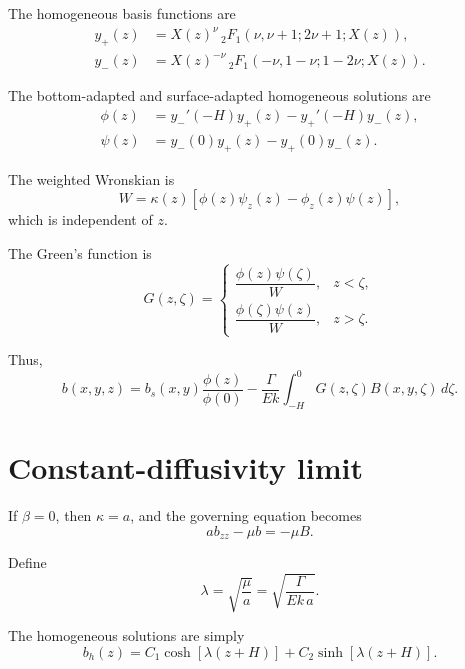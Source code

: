 \documentclass[10pt]{amsart}
\begin{document}
The homogeneous basis functions are
\begin{align}
y_+(z)
&=
X(z)^{\nu}\,
{}_2F_1\!\left(\nu,\nu+1;2\nu+1;X(z)\right),
\\[0.5em]
y_-(z)
&=
X(z)^{-\nu}\,
{}_2F_1\!\left(-\nu,1-\nu;1-2\nu;X(z)\right).
\end{align}

The bottom-adapted and surface-adapted homogeneous solutions are
\begin{align}
\phi(z)
&=
y_-'(-H)y_+(z)-y_+'(-H)y_-(z),
\\[0.5em]
\psi(z)
&=
y_-(0)y_+(z)-y_+(0)y_-(z).
\end{align}

The weighted Wronskian is
\begin{equation}
W
=
\kappa(z)
\left[
\phi(z)\psi_z(z)-\phi_z(z)\psi(z)
\right],
\end{equation}
which is independent of \(z\).

The Green's function is
\begin{equation}
G(z,\zeta)
=
\begin{cases}
\dfrac{\phi(z)\psi(\zeta)}{W},
& z<\zeta,\\[1.2em]
\dfrac{\phi(\zeta)\psi(z)}{W},
& z>\zeta.
\end{cases}
\end{equation}

Thus,
\begin{equation}
\boxed{
b(x,y,z)
=
b_s(x,y)\frac{\phi(z)}{\phi(0)}
-
\frac{\Gamma}{E k}
\int_{-H}^{0}
G(z,\zeta)B(x,y,\zeta)\,d\zeta.
}
\end{equation}

\section{Constant-diffusivity limit}

If \(\beta=0\), then \(\kappa=a\), and the governing equation becomes
\begin{equation}
a b_{zz}-\mu b=-\mu B.
\end{equation}

Define
\begin{equation}
\lambda = \sqrt{\frac{\mu}{a}}
=
\sqrt{\frac{\Gamma}{E k\,a}}.
\end{equation}

The homogeneous solutions are simply
\begin{equation}
b_h(z)=C_1\cosh\!\left[\lambda(z+H)\right]
+
C_2\sinh\!\left[\lambda(z+H)\right].
\end{equation}
\end{document}
